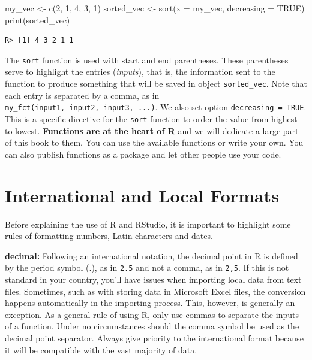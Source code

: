 \documentclass[
  12pt,
]{book}
\newenvironment{Shaded}{\begin{snugshade}}{\end{snugshade}}
\newcommand{\AttributeTok}[1]{\textcolor[rgb]{0.61,0.61,0.61}{#1}}
\newcommand{\ConstantTok}[1]{\textcolor[rgb]{0,0,0}{#1}}
\newcommand{\DecValTok}[1]{\textcolor[rgb]{0.06,0.06,0.06}{#1}}
\newcommand{\FunctionTok}[1]{\textcolor[rgb]{0,0,0}{#1}}
\newcommand{\NormalTok}[1]{#1}
\newcommand{\OtherTok}[1]{\textcolor[rgb]{0.37,0.37,0.37}{#1}}
\begin{document}
\begin{Shaded}
\begin{Highlighting}[]
\NormalTok{my\_vec }\OtherTok{\textless{}{-}} \FunctionTok{c}\NormalTok{(}\DecValTok{2}\NormalTok{, }\DecValTok{1}\NormalTok{, }\DecValTok{4}\NormalTok{, }\DecValTok{3}\NormalTok{, }\DecValTok{1}\NormalTok{)}
\NormalTok{sorted\_vec }\OtherTok{\textless{}{-}} \FunctionTok{sort}\NormalTok{(}\AttributeTok{x =}\NormalTok{ my\_vec, }\AttributeTok{decreasing =} \ConstantTok{TRUE}\NormalTok{)}
\FunctionTok{print}\NormalTok{(sorted\_vec)}
\end{Highlighting}
\end{Shaded}

\begin{verbatim}
R> [1] 4 3 2 1 1
\end{verbatim}

The \texttt{sort} function is used with start and end parentheses. These parentheses serve to highlight the entries (\emph{inputs}), that is, the information sent to the function to produce something that will be saved in object \texttt{sorted\_vec}. Note that each entry is separated by a comma, as in \texttt{my\_fct(input1,\ input2,\ input3,\ ...)}. We also set option \texttt{decreasing\ =\ TRUE}. This is a specific directive for the \texttt{sort} function to order the value from highest to lowest. \textbf{Functions are at the heart of R} and we will dedicate a large part of this book to them. You can use the available functions or write your own. You can also publish functions as a package and let other people use your code.

\hypertarget{international-and-local-formats}{%
\section{International and Local Formats}\label{international-and-local-formats}}

Before explaining the use of R and RStudio, it is important to highlight some rules of formatting numbers, Latin characters and dates.

\textbf{decimal:} Following an international notation, the decimal point in R is defined by the period symbol (.), as in \texttt{2.5} and not a comma, as in \texttt{2,5}. If this is not standard in your country, you'll have issues when importing local data from text files. Sometimes, such as with storing data in Microsoft Excel files, the conversion happens automatically in the importing process. This, however, is generally an exception. As a general rule of using R, only use commas to separate the inputs of a function. Under no circumstances should the comma symbol be used as the decimal point separator. Always give priority to the international format because it will be compatible with the vast majority of data. 
\end{document}
